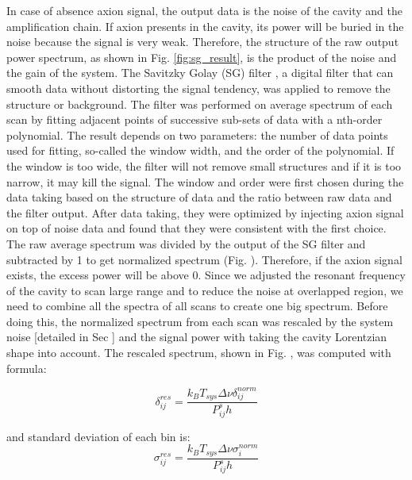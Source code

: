 In case of absence axion signal, the output data is the noise of the cavity and the amplification chain. If axion presents in the cavity, its power will be buried in the noise because the signal is very weak. Therefore, the structure of the raw output power spectrum, as shown in Fig. \ref{fig:sg_result}, is the product of the noise and the gain of the system. The Savitzky Golay (SG) filter \cite{SGFilter}, a digital filter that can smooth data without distorting the signal tendency, was applied to remove the structure or background.
The filter was performed on average spectrum of each scan by fitting adjacent points of successive sub-sets of data with a nth-order polynomial. The result depends on two parameters: the number of data points used for fitting, so-called the window width, and the order of the polynomial. If the window is too wide, the filter will not remove small structures and if it is too narrow, it may kill the signal. The window and order were first chosen during the data taking based on the structure of data and the ratio between raw data and the filter output. After data taking, they were optimized by injecting axion signal on top of noise data and found that they were consistent with the first choice.
The raw average spectrum was divided by the output of the SG filter and subtracted by 1 to get normalized spectrum (Fig. \cite{fig:}).
Therefore, if the axion signal exists, the excess power will be above 0.
Since we adjusted the resonant frequency of the cavity to scan large range and to reduce the noise at overlapped region, we need to combine all the spectra of all scans to create one big spectrum. Before doing this, the normalized spectrum from each scan was rescaled by the system noise [detailed in Sec \cite{sec:calibration}] and the signal power with taking the cavity Lorentzian shape into account. The rescaled spectrum, shown in Fig. \cite{}, was computed with formula:

\begin{equation}
  \label{eq:respower_eqn}
  \delta_{ij}^{res} = \frac{k_{B}T_{sys}\Delta\nu \delta_{ij}^{norm}}{P_{ij}^{s} h}
\end{equation}

and standard deviation of each bin is:
\begin{equation}
  \label{eq:ressigma_eqn}
  \sigma_{ij}^{res} = \frac{k_{B}T_{sys}\Delta\nu \sigma_{i}^{norm}}{P_{ij}^{s} h}
\end{equation}

